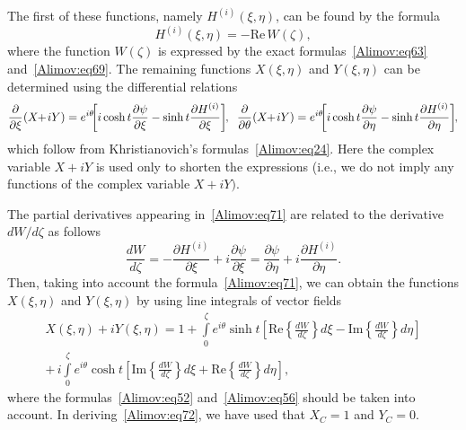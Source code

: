 \documentclass[
11pt,%
tightenlines,%
twoside,%
onecolumn,%
nofloats,%
nobibnotes,%
nofootinbib,%
superscriptaddress,%
noshowpacs,%
centertags]%
{revtex4-2}
\begin{document}
The first of these functions, namely $H^{(i)}(\xi, \eta)$, can be found by the formula
\begin{equation}
\label{Alimov:eq70} H^{(i)}(\xi, \eta) = - \mbox{Re} \, W(\zeta),
\end{equation}
where the function $W(\zeta)$ is expressed by the exact formulas~\eqref{Alimov:eq63}
and~\eqref{Alimov:eq69}. The remaining functions $X(\xi, \eta)$ and $Y(\xi, \eta)$ can be
determined using the differential relations
\begin{equation}
\label{Alimov:eq71} \frac{\partial }{\partial \xi}\hspace{-0.5mm}\left(
{X\hspace{-1mm}+\hspace{-0.5mm}iY} \right) = e^{i\theta}\hspace{-1.5mm}\left[ {i\cosh t
\frac{\partial \psi}{\partial \xi}}-\sinh t \frac{\partial H^{(i)}}{\partial \xi}
\right]\hspace{-1.0mm}, \;\; \frac{\partial }{\partial \theta}\hspace{-0.5mm}\left(
{X\hspace{-1mm}+\hspace{-0.5mm}iY} \right) = e^{i\theta}\hspace{-1.5mm}\left[ {i\cosh t
\frac{\partial \psi}{\partial \eta}}-\sinh t \frac{\partial H^{(i)}}{\partial
\eta}\right]\hspace{-1.0mm},
\end{equation}
which follow from Khristianovich's formulas~\eqref{Alimov:eq24}. Here the complex
variable $X + iY$ is used only to shorten the expressions (i.e., we do not imply any functions of
the complex variable $X + iY)$.

The partial derivatives appearing in~\eqref{Alimov:eq71} are related to the derivative
${dW}/{d\zeta}$ as follows~\cite{Alimov:bib19}
\[
\frac{dW}{d\zeta} = - \frac{\partial H^{(i)}}{\partial \xi} + i\frac{\partial \psi}{\partial \xi} =
\frac{\partial \psi}{\partial \eta} + i\frac{\partial H^{(i)}}{\partial \eta}.
\]
Then, taking into account the formula~\eqref{Alimov:eq71}, we can obtain the functions $X(\xi,
\eta)$ and $Y(\xi, \eta)$ by using line integrals of vector fields
\begin{equation}
\label{Alimov:eq72}
\begin{array}{c}
 X(\xi, \eta) + iY(\xi, \eta) = 1 + \int\limits_0^\zeta {e^{i\theta}\sinh
t\left[ {\mbox{Re} \left\{ {\frac{dW}{d\zeta }} \right\}d\xi - \mbox{Im}\left\{
{\frac{dW}{d\zeta }} \right\}d\eta } \right]} \\
 + \, i\int\limits_0^\zeta
{e^{i\theta}\cosh t\left[ {\mbox{Im}\left\{ {\frac{dW}{d\zeta }} \right\}d\xi +
\mbox{Re}\left\{ {\frac{dW}{d\zeta}} \right\}d\eta} \right]} ,
 \end{array}
\end{equation}
where the formulas~\eqref{Alimov:eq52} and~\eqref{Alimov:eq56} should be taken into
account. In deriving~\eqref{Alimov:eq72}, we have used that $X_C = 1$ and $Y_C = 0$.
\end{document}
